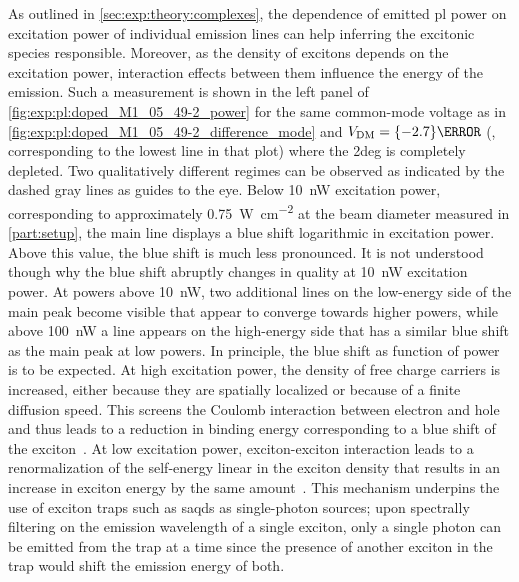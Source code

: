 As outlined in \cref{sec:exp:theory:complexes}, the dependence of emitted \gls{pl} power on excitation power of individual emission lines can help inferring the excitonic species responsible.
Moreover, as the density of excitons depends on the excitation power, interaction effects between them influence the energy of the emission.
Such a measurement is shown in the left panel of \cref{fig:exp:pl:doped_M1_05_49-2_power} for the same common-mode voltage as in \cref{fig:exp:pl:doped_M1_05_49-2_difference_mode} and $\VDM = \qty{-2.7}{\volt}$ (\ie, corresponding to the lowest line in that plot) where the \gls{2deg} is completely depleted.
Two qualitatively different regimes can be observed as indicated by the dashed gray lines as guides to the eye.
Below \qty{10}{\nano\watt} excitation power, corresponding to approximately \qty{0.75}{\watt\per\square\centi\meter} at the beam diameter measured in \cref{part:setup}, the main line displays a blue shift logarithmic in excitation power.
Above this value, the blue shift is much less pronounced.
It is not understood though why the blue shift abruptly changes in quality at \qty{10}{\nano\watt} excitation power.
At powers above \qty{10}{\nano\watt}, two additional lines on the low-energy side of the main peak become visible that appear to converge towards higher powers, while above \qty{100}{\nano\watt} a line appears on the high-energy side that has a similar blue shift as the main peak at low powers.
In principle, the blue shift as function of power is to be expected.
At high excitation power, the density of free charge carriers is increased, either because they are spatially localized or because of a finite diffusion speed.
This screens the Coulomb interaction between electron and hole and thus leads to a reduction in binding energy corresponding to a blue shift of the exciton~\cite{Peyghambarian1984}.
At low excitation power, exciton-exciton interaction leads to a renormalization of the self-energy linear in the exciton density that results in an increase in exciton energy by the same amount~\cite{Butov1999,Snoke2000,Brown2001,Schindler2008,Remeika2015}.
This mechanism underpins the use of exciton traps such as \glspl{saqd} as single-photon sources; upon spectrally filtering on the emission wavelength of a single exciton, only a single photon can be emitted from the trap at a time since the presence of another exciton in the trap would shift the emission energy of both.

